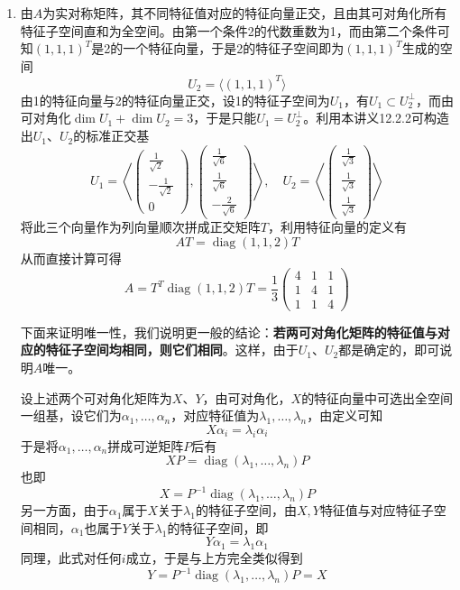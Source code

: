 \documentclass[a4paper,UTF8,fontset=windows]{ctexart}
\DeclareMathOperator{\diag}{diag}
\begin{document}
\begin{enumerate}
\begin{enumerate}
\begin{enumerate}
            \item 
            由$A$为实对称矩阵，其不同特征值对应的特征向量正交，且由其可对角化所有特征子空间直和为全空间。由第一个条件2的代数重数为1，而由第二个条件可知$(1,1,1)^T$是2的一个特征向量，于是2的特征子空间即为$(1,1,1)^T$生成的空间
            $$U_2=\langle(1,1,1)^T\rangle$$
            由1的特征向量与2的特征向量正交，设1的特征子空间为$U_1$，有$U_1\subset U_2^\bot$，而由可对角化$\dim U_1+\dim U_2=3$，于是只能$U_1=U_2^\bot$。利用本讲义12.2.2可构造出$U_1$、$U_2$的标准正交基
            $$U_1=\left<\begin{pmatrix}\frac{1}{\sqrt2}\\-\frac{1}{\sqrt2}\\0\end{pmatrix},\begin{pmatrix}\frac{1}{\sqrt6}\\\frac{1}{\sqrt6}\\-\frac{2}{\sqrt6}\end{pmatrix}\right>,\quad U_2=\left<\begin{pmatrix}\frac{1}{\sqrt3}\\\frac{1}{\sqrt3}\\\frac{1}{\sqrt3}\end{pmatrix}\right>$$
            将此三个向量作为列向量顺次拼成正交矩阵$T$，利用特征向量的定义有
            $$AT=\diag(1,1,2)T$$
            从而直接计算可得
            $$A=T^T\diag(1,1,2)T=\frac{1}{3}\begin{pmatrix}4&1&1\\1&4&1\\1&1&4\end{pmatrix}$$

            下面来证明唯一性，我们说明更一般的结论：\textbf{若两可对角化矩阵的特征值与对应的特征子空间均相同，则它们相同}。这样，由于$U_1$、$U_2$都是确定的，即可说明$A$唯一。

            设上述两个可对角化矩阵为$X$、$Y$，由可对角化，$X$的特征向量中可选出全空间一组基，设它们为$\alpha_1,\dots,\alpha_n$，对应特征值为$\lambda_1,\dots,\lambda_n$，由定义可知
            $$X\alpha_i=\lambda_i\alpha_i$$
            于是将$\alpha_1,\dots,\alpha_n$拼成可逆矩阵$P$后有
            $$XP=\diag(\lambda_1,\dots,\lambda_n)P$$
            也即
            $$X=P^{-1}\diag(\lambda_1,\dots,\lambda_n)P$$
            另一方面，由于$\alpha_1$属于$X$关于$\lambda_1$的特征子空间，由$X,Y$特征值与对应特征子空间相同，$\alpha_1$也属于$Y$关于$\lambda_1$的特征子空间，即
            $$Y\alpha_1=\lambda_1\alpha_1$$
            同理，此式对任何$i$成立，于是与上方完全类似得到
            $$Y=P^{-1}\diag(\lambda_1,\dots,\lambda_n)P=X$$
        \end{enumerate}
        

\end{enumerate}
\end{enumerate}
\end{document}
